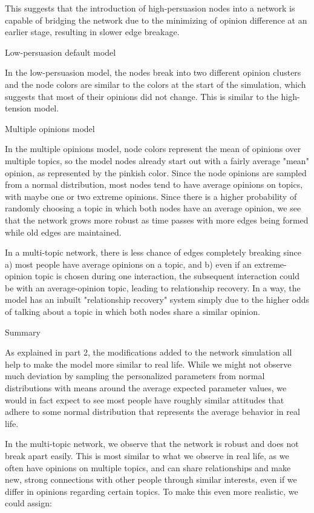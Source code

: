 \documentclass[11pt]{article}
\begin{document}
This suggests that the introduction of high-persuasion nodes into a
network is capable of bridging the network due to the minimizing of
opinion difference at an earlier stage, resulting in slower edge
breakage.

Low-persuasion default model

In the low-persuasion model, the nodes break into two different opinion
clusters and the node colors are similar to the colors at the start of
the simulation, which suggests that most of their opinions did not
change. This is similar to the high-tension model.

Multiple opinions model

In the multiple opinions model, node colors represent the mean of
opinions over multiple topics, so the model nodes already start out with
a fairly average "mean" opinion, as represented by the pinkish color.
Since the node opinions are sampled from a normal distribution, most
nodes tend to have average opinions on topics, with maybe one or two
extreme opinions. Since there is a higher probability of randomly
choosing a topic in which both nodes have an average opinion, we see
that the network grows more robust as time passes with more edges being
formed while old edges are maintained.

In a multi-topic network, there is less chance of edges completely
breaking since a) most people have average opinions on a topic, and b)
even if an extreme-opinion topic is chosen during one interaction, the
subsequent interaction could be with an average-opinion topic, leading
to relationship recovery. In a way, the model has an inbuilt
"relationship recovery" system simply due to the higher odds of talking
about a topic in which both nodes share a similar opinion.

Summary

As explained in part 2, the modifications added to the network
simulation all help to make the model more similar to real life. While
we might not observe much deviation by sampling the personalized
parameters from normal distributions with means around the average
expected parameter values, we would in fact expect to see most people
have roughly similar attitudes that adhere to some normal distribution
that represents the average behavior in real life.

In the multi-topic network, we observe that the network is robust and
does not break apart easily. This is most similar to what we observe in
real life, as we often have opinions on multiple topics, and can share
relationships and make new, strong connections with other people through
similar interests, even if we differ in opinions regarding certain
topics. To make this even more realistic, we could assign:
\end{document}
